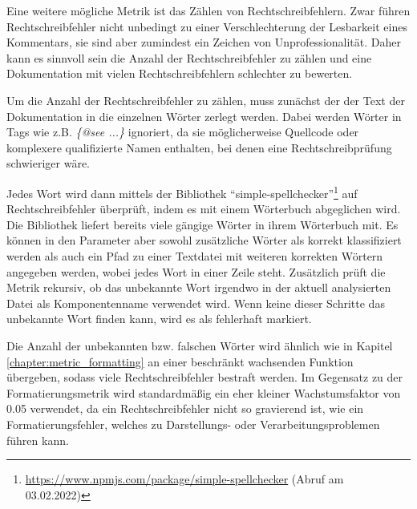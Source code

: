  Eine weitere mögliche Metrik ist das Zählen von Rechtschreibfehlern. Zwar führen Rechtschreibfehler nicht unbedingt zu einer Verschlechterung der Lesbarkeit eines Kommentars, sie sind aber zumindest ein Zeichen von Unprofessionalität. Daher kann es sinnvoll sein die Anzahl der Rechtschreibfehler zu zählen und eine Dokumentation mit vielen Rechtschreibfehlern schlechter zu bewerten. 
 
 Um die Anzahl der Rechtschreibfehler zu zählen, muss zunächst der der Text der Dokumentation in die einzelnen Wörter zerlegt werden. Dabei werden Wörter in Tags wie z.B. \textit{\{@see ...\}} ignoriert, da sie möglicherweise Quellcode oder komplexere qualifizierte Namen enthalten, bei denen eine Rechtschreibprüfung schwieriger wäre. 
 
 Jedes Wort wird dann mittels der Bibliothek  \enquote{simple-spellchecker}\footnote{\href{Simple-Spellchecker}{https://www.npmjs.com/package/simple-spellchecker} (Abruf am 03.02.2022)} auf Rechtschreibfehler überprüft, indem es mit einem Wörterbuch abgeglichen wird. Die Bibliothek liefert bereits viele gängige Wörter in ihrem Wörterbuch mit. Es können in den Parameter aber sowohl zusätzliche Wörter als korrekt klassifiziert werden als auch ein Pfad zu einer Textdatei mit weiteren korrekten Wörtern angegeben werden, wobei jedes Wort in einer Zeile steht. Zusätzlich prüft die Metrik rekursiv, ob das unbekannte Wort irgendwo in der aktuell analysierten Datei als Komponentenname verwendet wird. Wenn keine dieser Schritte das unbekannte Wort finden kann, wird es als fehlerhaft markiert. 
 
 Die Anzahl der unbekannten bzw. falschen Wörter wird ähnlich wie in Kapitel \ref{chapter:metric_formatting} an einer beschränkt wachsenden Funktion übergeben, sodass viele Rechtschreibfehler bestraft werden. Im Gegensatz zu der Formatierungsmetrik wird standardmäßig ein eher kleiner Wachstumsfaktor von 0.05 verwendet, da ein Rechtschreibfehler nicht so gravierend ist, wie ein Formatierungsfehler, welches zu Darstellungs- oder Verarbeitungsproblemen führen kann. 
 
